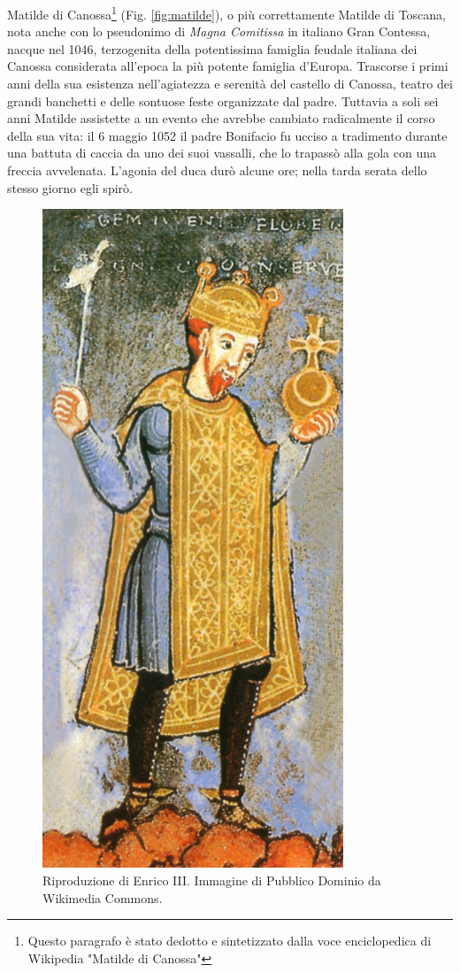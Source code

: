 \documentclass[letterpaper,twocolumn,openany,nodeprecatedcode]{dndbook}
\begin{document}
Matilde di Canossa\footnote{Questo paragrafo è stato dedotto e sintetizzato dalla voce enciclopedica di Wikipedia "Matilde di Canossa"} (Fig. \ref{fig:matilde})\cite{wiki:matilde}, o più correttamente Matilde di Toscana, nota anche con lo pseudonimo di \textit{Magna Comitissa} in italiano Gran Contessa, nacque nel 1046, terzogenita della potentissima famiglia feudale italiana dei Canossa considerata all'epoca la più potente famiglia d'Europa. Trascorse i primi anni della sua esistenza nell'agiatezza e serenità del castello di Canossa, teatro dei grandi banchetti e delle sontuose feste organizzate dal padre. Tuttavia a soli sei anni Matilde assistette a un evento che avrebbe cambiato radicalmente il corso della sua vita: il 6 maggio 1052 il padre Bonifacio fu ucciso a tradimento durante una battuta di caccia da uno dei suoi vassalli, che lo trapassò alla gola con una freccia avvelenata. L'agonia del duca durò alcune ore; nella tarda serata dello stesso giorno egli spirò.

\begin{figure}
\centering
\includegraphics[width=9cm]{./img/enrico3.png}
\caption{Riproduzione di Enrico III. Immagine di Pubblico Dominio da Wikimedia Commons.}
\label{enrico3}
\end{figure}
\end{document}
